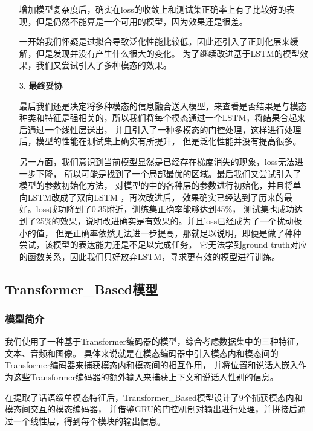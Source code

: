\documentclass[11pt]{article}
\begin{document}
\begin{enumerate}
                增加模型复杂度后，确实在loss的收敛上和测试集正确率上有了比较好的表现，但是仍然不能算是一个可用的模型，因为效果还是很差。
                
                一开始我们怀疑是过拟合导致泛化性能比较低，因此还引入了正则化层来缓解，但是发现并没有产生什么很大的变化。
                为了继续改进基于LSTM的模型效果，我们又尝试引入了多种模态的效果。


                \item [3. ]\textbf{最终妥协}\par
                最后我们还是决定将多种模态的信息融合送入模型，来查看是否结果是与模态
                种类和特征是强相关的，所以我们将每个模态通过一个LSTM，将结果合起来后通过一个线性层送出，
                并且引入了一种多模态的门控处理，这样进行处理后，模型的性能在测试集上确实有所提升，
                但是泛化性能并没有提高很多。
                
                另一方面，我们意识到当前模型显然是已经存在梯度消失的现象，loss无法进一步下降，
                所以可能是找到了一个局部最优的区域。最后我们又尝试引入了模型的参数初始化方法，
                对模型的中的各种层的参数进行初始化，并且将单向LSTM改成了双向LSTM ，再次改进后，
                效果确实已经达到了历来的最好。loss成功降到了0.35附近，训练集正确率能够达到45\%，
                测试集也成功达到了25\%的效果，说明改进确实是有效果的。并且loss已经成为了一个扰动极小的值，
                但是正确率依然无法进一步提高，那就足以说明，即便是做了种种尝试，该模型的表达能力还是不足以完成任务，
                它无法学到ground truth对应的函数关系，因此我们只好放弃LSTM，寻求更有效的模型进行训练。

            \end{enumerate}

        \subsection{Transformer\_Based模型}
            \subsubsection{模型简介}
            我们使用了一种基于Transformer编码器的模型，综合考虑数据集中的三种特征，文本、音频和图像。
            具体来说就是在模态编码器中引入模态内和模态间的Transformer编码器来捕获模态内和模态间的相互作用，
            并将位置和说话人嵌入作为这些Transformer编码器的额外输入来捕获上下文和说话人性别的信息。
            
            在提取了话语级单模态特征后，Transformer\_Based模型设计了9个捕获模态内和模态间交互的模态编码器，
            并借鉴GRU的门控机制对输出进行处理，并拼接后通过一个线性层，得到每个模块的输出信息。
            
\end{document}
